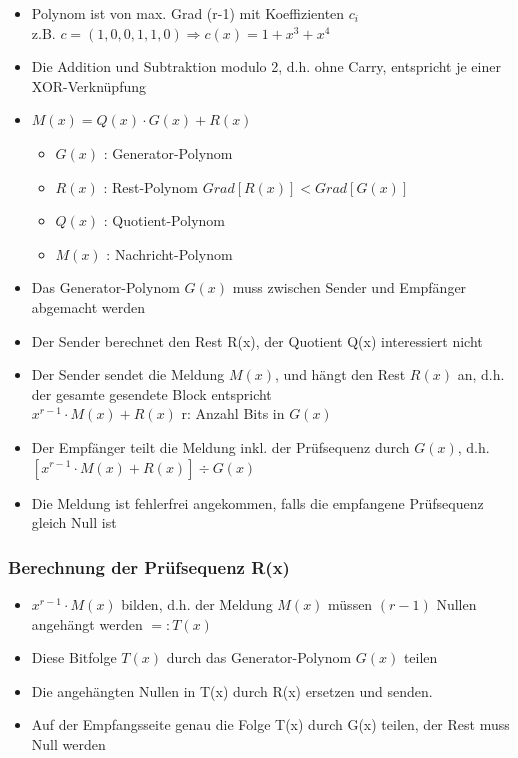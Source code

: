\begin{itemize}
	\item Polynom ist von max. Grad (r-1) mit Koeffizienten $c_i$\\
		z.B. $c = (1, 0, 0, 1, 1, 0) \Rightarrow c(x) = 1 + x^3 + x^4$
	\item Die Addition und Subtraktion modulo 2, d.h. ohne Carry, entspricht je einer XOR-Verknüpfung
	\item $M(x) = Q(x) \cdot G(x) + R(x)$
	\begin{itemize}
		\item $G(x)$ : Generator-Polynom
		\item $R(x)$ : Rest-Polynom \qquad $Grad[R(x)] < Grad[G(x)]$
		\item $Q(x)$ : Quotient-Polynom
		\item $M(x)$ : Nachricht-Polynom
	\end{itemize}
	\item Das Generator-Polynom $G(x)$ muss zwischen Sender und Empfänger abgemacht werden
	\item Der Sender berechnet den Rest R(x), der Quotient Q(x) interessiert nicht
	\item Der Sender sendet die Meldung $M(x)$, und hängt den Rest $R(x)$ an, d.h. der gesamte gesendete Block entspricht\\
		$x^{r-1} \cdot M(x) + R(x)$ \qquad	r: Anzahl Bits in $G(x)$
	\item Der Empfänger teilt die Meldung inkl. der Prüfsequenz durch $G(x)$, d.h.
		$[x^{r-1} \cdot M(x) + R(x)] \div G(x)$
	\item Die Meldung ist fehlerfrei angekommen, falls die empfangene Prüfsequenz gleich Null ist
\end{itemize}

\subsubsection{Berechnung der Prüfsequenz R(x)}
\begin{itemize}
	\item $x^{r-1} \cdot M(x)$ bilden, d.h. der Meldung $M(x)$ müssen $(r-1)$ Nullen angehängt werden $=: T(x)$
	\item Diese Bitfolge $T(x)$ durch das Generator-Polynom $G(x)$ teilen
	\item Die angehängten Nullen in T(x) durch R(x) ersetzen und senden.
	\item Auf der Empfangsseite genau die Folge T(x) durch G(x) teilen, der Rest muss Null werden
\end{itemize}

